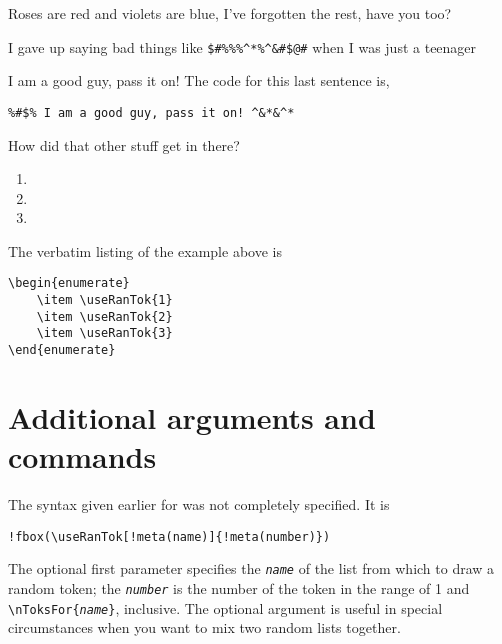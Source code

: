 \documentclass{article}
\def\meta#1{\textit{\texttt{#1}}}
\begin{document}
%
\begin{rtVW}
\begin{minipage}[t]{.67\linewidth}
Roses are red and violets are blue,
I've forgotten the rest, have you too?
\end{minipage}
\end{rtVW}
\begin{rtVW}
\begin{minipage}[t]{.67\linewidth}
I gave up saying bad things like
\verb!$#%%%^*%^&#$@#! when I was just a teenager
\end{minipage}
\end{rtVW}
\begin{rtVW}
\begin{minipage}[t]{.67\linewidth}
I am a good guy, pass it on! The code for this last sentence is,
\begin{verbatim}
%#$% I am a good guy, pass it on! ^&*&^*
\end{verbatim}
How did that other stuff get in there?
\end{minipage}
\end{rtVW}
\eRTVToks
\begin{enumerate}
    \item {}
    \item {}
    \item {}
\end{enumerate}
The verbatim listing of the example above is
\begin{Verbatim}[xleftmargin=20pt,commandchars=!()]
\begin{enumerate}
    \item \useRanTok{1}
    \item \useRanTok{2}
    \item \useRanTok{3}
\end{enumerate}
\end{Verbatim}

\section{Additional arguments and commands}\label{AddCmds}

The syntax given earlier for  was not completely specified.
It is
\begin{Verbatim}[xleftmargin=20pt,commandchars=!()]
!fbox(\useRanTok[!meta(name)]{!meta(number)})
\end{Verbatim}
The optional first parameter specifies the \meta{name} of the list from
which to draw a random token; the \meta{number} is the number of the
token in the range of 1 and \verb!\nToksFor{!\meta{name}\verb!}!,
inclusive. The optional argument is useful in special circumstances when
you want to mix two random lists together.
\end{document}
